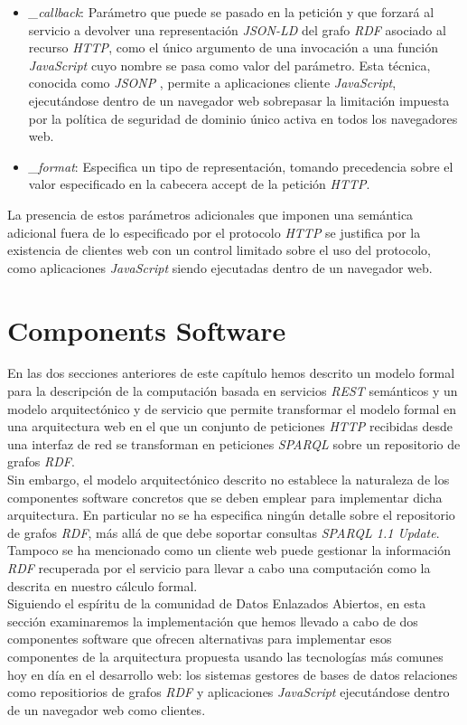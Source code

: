 \begin{itemize}

\item \textit{\_callback}: Par\'ametro que puede se pasado en la petici\'on y que forzar\'a al servicio a devolver una representaci\'on \textit{JSON-LD} del grafo \textit{RDF} asociado al recurso \textit{HTTP}, como el \'unico argumento de una invocaci\'on a una funci\'on \textit{JavaScript} cuyo nombre se pasa como valor del par\'ametro. Esta t\'ecnica, conocida como \textit{JSONP} \cite{jsonp}, permite a aplicaciones cliente \textit{JavaScript}, ejecut\'andose dentro de un navegador web sobrepasar la limitaci\'on impuesta por la pol\'itica de seguridad de dominio \'unico activa en todos los navegadores web.\\
\item \textit{\_format}: Especifica un tipo de representaci\'on, tomando precedencia sobre el valor especificado en la cabecera accept de la petici\'on \textit{HTTP}.

\end{itemize}

La presencia de estos par\'ametros adicionales que imponen una sem\'antica adicional fuera de lo especificado por el protocolo \textit{HTTP} se justifica por la existencia de clientes web con un control limitado sobre el uso del protocolo, como aplicaciones \textit{JavaScript} siendo ejecutadas dentro de un navegador web.

\section{Components Software}

En las dos secciones anteriores de este cap\'itulo hemos descrito un modelo formal para la descripci\'on de la computaci\'on basada en servicios \textit{REST} sem\'anticos y un modelo arquitect\'onico y de servicio que permite transformar el modelo formal en una arquitectura web en el que un conjunto de peticiones \textit{HTTP} recibidas desde una interfaz de red se transforman en peticiones \textit{SPARQL} sobre un repositorio de grafos \textit{RDF}.\\
Sin embargo, el modelo arquitect\'onico descrito no establece la naturaleza de los componentes software concretos que se deben emplear para implementar dicha arquitectura. En particular no se ha especifica ning\'un detalle sobre el repositorio de grafos \textit{RDF}, m\'as all\'a de que debe soportar consultas \textit{SPARQL 1.1 Update}. Tampoco se ha mencionado como un cliente web puede gestionar la informaci\'on \textit{RDF} recuperada por el servicio para llevar a cabo una computaci\'on como la descrita en  nuestro c\'alculo formal.\\
Siguiendo el esp\'iritu de la comunidad de Datos Enlazados Abiertos, en esta secci\'on examinaremos la implementaci\'on que hemos llevado a cabo de dos componentes software que ofrecen alternativas para implementar esos componentes de la arquitectura propuesta usando las tecnolog\'ias m\'as comunes hoy en d\'ia en el desarrollo web: los sistemas gestores de bases de datos relaciones como repositiorios de grafos \textit{RDF} y aplicaciones \textit{JavaScript} ejecut\'andose dentro de un navegador web como clientes.


